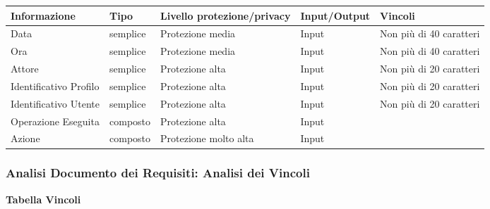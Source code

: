 \begin{tabular} {|P{3cm}|P{2.5cm}|P{3cm}|P{3cm}|P{3cm}|}
    \hline
    \textbf{Informazione}  & \textbf{Tipo} & \textbf{Livello protezione/privacy} & \textbf{Input/Output} & \textbf{Vincoli}        \\
    \hline
    Data                   & semplice      & Protezione media                    & Input                 & Non più di 40 caratteri \\
    \hline
    Ora                    & semplice      & Protezione media                    & Input                 & Non più di 40 caratteri \\
    \hline
    Attore                 & semplice      & Protezione alta                     & Input                 & Non più di 20 caratteri \\
    \hline
    Identificativo Profilo & semplice      & Protezione alta                     & Input                 & Non più di 20 caratteri \\
    \hline
    Identificativo Utente  & semplice      & Protezione alta                     & Input                 & Non più di 20 caratteri \\
    \hline
    Operazione Eseguita    & composto      & Protezione alta                     & Input                 &                         \\
    \hline
    Azione                 & composto      & Protezione molto alta               & Input                 &                         \\
    \hline
\end{tabular}

\newpage
\subsubsection{Analisi Documento dei Requisiti: Analisi dei Vincoli}
\hfill \break

\textbf{Tabella Vincoli}
\hfill \break


